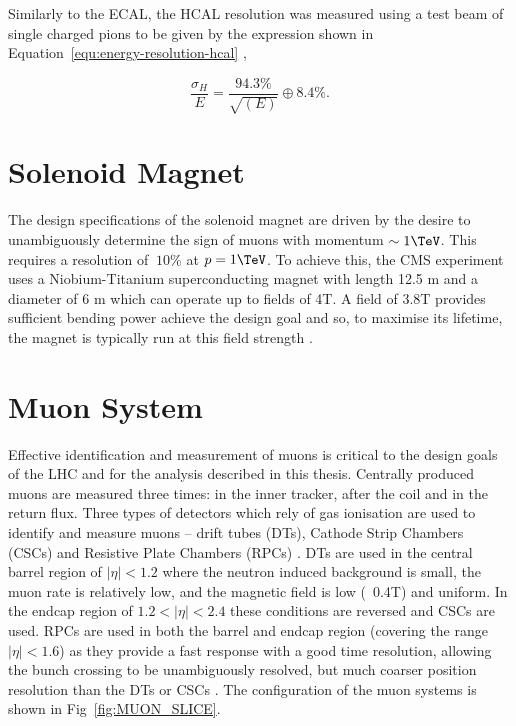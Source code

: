 Similarly to the ECAL, the HCAL resolution was measured using a test beam of single charged pions to be given by the expression shown in Equation~\ref{equ:energy-resolution-hcal} 
\cite{hcal_performance},

\begin{equation}
\frac{\sigma_H}{E} = \frac{94.3\%}{\sqrt{(E)}} \oplus 8.4\%.
\label{equ:energy-resolution-hcal}
\end{equation}

\section{Solenoid Magnet}

The design specifications of the solenoid magnet are driven by the desire to unambiguously determine
the sign of muons with momentum $\sim 1\TeV$. This requires a resolution of $~10\%$ at $p=1\TeV$.
To achieve this, the CMS experiment uses a Niobium-Titanium superconducting magnet with length 
12.5 m and a diameter of 6 m which can operate up to fields of 4T. A field of 3.8T provides
sufficient bending power achieve the design goal and so, to maximise its lifetime, the magnet is
typically run at this field strength \cite{CMS}.

\section{Muon System}

Effective identification and measurement of muons is critical to the design goals of the LHC and
for the analysis described in this thesis. Centrally produced muons are measured three times:
in the inner tracker, after the coil and in the return flux. Three types of detectors which rely of gas ionisation are 
used to identify and measure muons -- drift tubes (DTs), Cathode Strip Chambers (CSCs) and Resistive
Plate Chambers (RPCs) \cite{CMS}. DTs are used in the central barrel region of $|\eta| < 1.2$ where 
the neutron induced background is small, the muon rate is relatively low, 
and the magnetic field is low (~0.4T) and uniform. In the endcap region of $ 1.2 < |\eta| < 2.4$ these conditions are 
reversed and CSCs are used. RPCs are used in both the barrel and endcap region (covering the range $|\eta| < 1.6$) as they provide a fast response with a good time 
resolution, allowing the bunch crossing to be unambiguously resolved, but much coarser position resolution than the DTs or CSCs \cite{muon_tdr}. 
The configuration of the muon systems is shown in Fig~\ref{fig:MUON_SLICE}.


